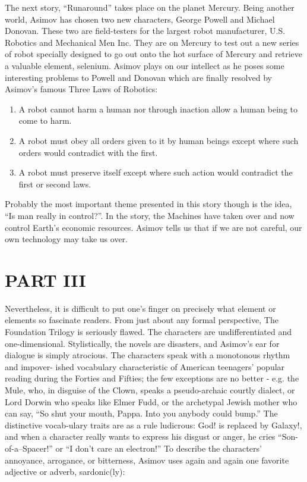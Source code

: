 \documentclass[12pt, a4paper]{article}
\begin{document}
The next story, ``Runaround'' takes place on the planet Mercury.
Being another world, Asimov has chosen two new characters, George
Powell and Michael Donovan.  These two are field-testers for the
largest robot manufacturer, U.S.  Robotics and Mechanical Men Inc.
They are on Mercury to test out a new series of robot specially
designed to go out onto the hot surface of Mercury and retrieve a
valuable element, selenium.  Asimov plays on our intellect as he poses
some interesting problems to Powell and Donovan which are finally
resolved by Asimov's famous Three Laws of Robotics:


\begin{enumerate}
\item A robot cannot harm a human nor through inaction allow a human
      being to come to harm.

\item A robot must obey all orders given to it by human beings except
      where such orders would contradict with the first.

\item A robot must preserve itself except where such action would
      contradict the first or second laws.

\end{enumerate}

Probably the most important theme presented in this story though is
the idea, ``Is man really in control?''. In the story, the Machines
have taken over and now control Earth's economic resources.  Asimov
tells us that if we are not careful, our own technology may take us
over.


\section{PART III}

Nevertheless, it is difficult to put one's finger on precisely what
element or elements so fascinate readers.  From just about any formal
perspective, The Foundation Trilogy is seriously flawed.  The
characters are undifferentiated and one-dimensional.  Stylistically,
the novels are disasters, and Asimov's ear for dialogue is simply
atrocious.  The characters speak with a monotonous rhythm and impover-
ished vocabulary characteristic of American teenagers' popular reading
during the Forties and Fifties; the few exceptions are no better -
e.g.  the Mule, who, in disguise of the Clown, speaks a pseudo-archaic
courtly dialect, or Lord Dorwin who speaks like Elmer Fudd, or the
archetypal Jewish mother who can say, ``So shut your mouth, Pappa.
Into you anybody could bump.'' The distinctive vocab-ulary traits are
as a rule ludicrous: God!  is replaced by Galaxy!, and when a
character really wants to express his disgust or anger, he cries
``Son-of-a--Spacer!'' or ``I don't care an electron!'' To describe the
characters' annoyance, arrogance, or bitterness, Asimov uses again and
again one favorite adjective or adverb, sardonic(ly):
\end{document}
